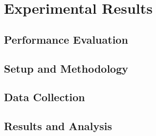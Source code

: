 \chapter{Experimental Results}
\label{chap:results}

\setcounter{section}{0}
\setcounter{subsection}{0}

\section{Performance Evaluation}
\label{sec:performance}

\FloatBarrier  %

\section{Setup and Methodology}


\section{Data Collection}


\section{Results and Analysis}
